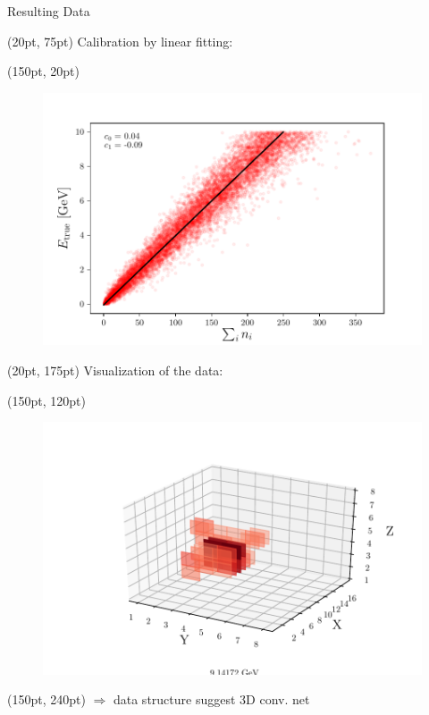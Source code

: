 \documentclass[10pt]{beamer}
\begin{document}
\begin{frame}{Resulting Data}
  \begin{textblock*}{250pt}(20pt, 75pt)
    Calibration by linear fitting:
  \end{textblock*}
  \begin{textblock*}{150pt}(150pt, 20pt)
    \begin{figure}[htp]
      \includegraphics[width=\textwidth]{../images/e-vs-sum_n_fit.pdf}
    \end{figure}
  \end{textblock*}
  \begin{textblock*}{250pt}(20pt, 175pt)
    Visualization of the data:
  \end{textblock*}
  \begin{textblock*}{135pt}(150pt, 120pt)
    \begin{figure}[htp]
      \includegraphics[width=1.1\textwidth]{../images/data_display.pdf}
    \end{figure}
  \end{textblock*}
  \begin{textblock*}{250pt}(150pt, 240pt)
    $\Rightarrow$ data structure suggest 3D conv. net
  \end{textblock*}
\end{frame}
\end{document}
